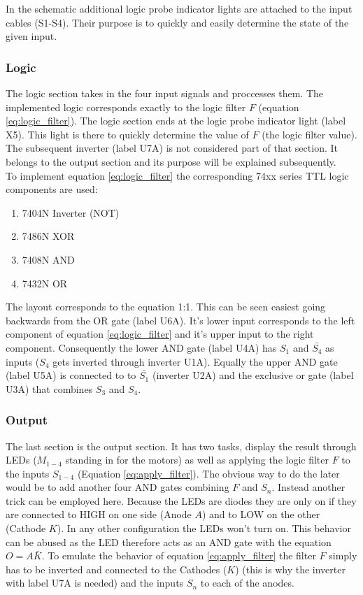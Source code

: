 \documentclass[14pt]{article}
\begin{document}
In the schematic additional logic probe indicator lights are attached to the input cables (S1-S4). Their purpose is to quickly and easily
determine the state of the given input.

\subsubsection{Logic}

The logic section takes in the four input signals and proccesses them. The implemented logic corresponds exactly to the logic filter
$F$ (equation \ref{eq:logic_filter}). The logic section ends at the logic probe indicator light (label X5). This light is there to quickly
determine the value of $F$ (the logic filter value). The subsequent inverter (label U7A) is not considered
part of that section. It belongs to the output section and its purpose will be explained subsequently.\\

To implement equation \ref{eq:logic_filter} the corresponding 74xx series TTL logic components are used:

\begin{enumerate}
  \item 7404N Inverter (NOT) 
  \item 7486N XOR 
  \item 7408N AND 
  \item 7432N OR  
\end{enumerate}

The layout corresponds to the equation 1:1. This can be seen easiest going backwards from the OR gate (label U6A). It's lower
input corresponds to the left component of equation \ref{eq:logic_filter} and it's upper input to the right component. Consequently the lower
AND gate (label U4A) has $S_1$ and $\bar{S_4}$ as inputs ($S_4$ gets inverted through inverter U1A). Equally the upper AND gate (label U5A) is
connected to to $\bar{S_1}$ (inverter U2A) and the exclusive or gate (label U3A) that combines $S_3$ and $S_4$.

\subsubsection{Output}

The last section is the output section. It has two tasks, display the result through LEDs ($M_{1-4}$ standing in for the motors) as well as applying 
the logic filter $F$ to the inputs $S_{1-4}$ (Equation \ref{eq:apply_filter}). The obvious way to do the later would be to add another four
AND gates combining $F$ and $S_n$. Instead another trick can be employed here. Because the LEDs are diodes they are only on if they are connected
to HIGH on one side (Anode $A$) and to LOW on the other (Cathode $K$). In any other configuration the LEDs won't turn on. This behavior can be abused as the
LED therefore acts as an AND gate with the equation $O = A\bar{K}$. To emulate the behavior of equation \ref{eq:apply_filter} the filter $F$ simply has
to be inverted and connected to the Cathodes ($K$) (this is why the inverter with label U7A is needed) and the inputs $S_n$ to each of the anodes.\\
\end{document}
